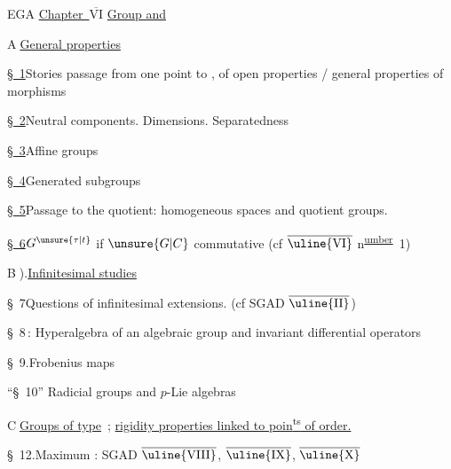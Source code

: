 \noindent EGA \uline{Chapter\ $\overline{\mathrm{VI}}$}\qquad
\uline{Group  and }

\noindent\textcircled{A}\quad \uline{General properties}

\noindent\uline{\S~1}\quad Stories  passage from one point to , of open properties / general properties of morphisms

\noindent\uline{\S~2}\quad Neutral components. Dimensions. Separatedness

\noindent\uline{\S~3}\quad Affine groups

\reversemarginpar
\noindent{}\uline{\S~4}\quad Generated subgroups
\normalmarginpar

\noindent\uline{\S~5}\quad Passage to the quotient: homogeneous spaces and quotient groups.

\noindent\uline{\S~6}\quad $G^{\unsure{\tau|t}}$ if $\unsure{G|C}$ commutative (cf  $\overline{\text{\uline{VI}}}$ n\textsuperscript{\uline{umber}}~1)

\noindent\textcircled{B}).\quad \uline{Infinitesimal studies}

\noindent\S~7\quad Questions of infinitesimal extensions. (cf SGAD $\overline{\text{\uline{II}}}$)

\noindent\S~8\,: \quad Hyperalgebra of an algebraic group and invariant differential operators

\noindent\S~9.\quad Frobenius maps

\noindent``\S~10''\quad {} Radicial groups and $p$-Lie algebras

\noindent{}

\noindent{}

\noindent\textcircled{C}\quad \uline{Groups of  type}\ ; \uline{rigidity properties linked to poin\textsuperscript{ts} of  order.}

\noindent\S~12.\quad Maximum : SGAD $\overline{\text{\uline{VIII}}}$, $\overline{\text{\uline{IX}}}$, $\overline{\text{\uline{X}}}$

\clearpage
